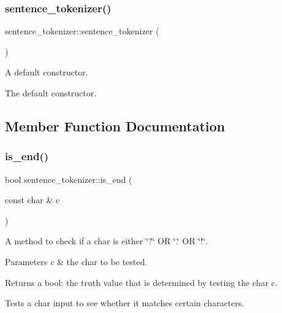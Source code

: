 \subsubsection{\texorpdfstring{sentence\+\_\+tokenizer()}{sentence\_tokenizer()}}
{\footnotesize\ttfamily sentence\+\_\+tokenizer\+::sentence\+\_\+tokenizer (\begin{DoxyParamCaption}{ }\end{DoxyParamCaption})}



A default constructor. 

The default constructor. 

\subsection{Member Function Documentation}
\mbox{\label{classsentence__tokenizer_accdc817790cdb696912ec8076701f8a9}} 
\subsubsection{\texorpdfstring{is\+\_\+end()}{is\_end()}}
{\footnotesize\ttfamily bool sentence\+\_\+tokenizer\+::is\+\_\+end (\begin{DoxyParamCaption}\item[{const char \&}]{c }\end{DoxyParamCaption})}



A method to check if a char is either \char`\"{}?\char`\"{} OR \char`\"{}.\char`\"{} OR \char`\"{}!\char`\"{}. 


\begin{DoxyParams}{Parameters}
{\em c} & the char to be tested. \\
\hline
\end{DoxyParams}
\begin{DoxyReturn}{Returns}
a bool\+: the truth value that is determined by testing the char c.
\end{DoxyReturn}
Tests a char input to see whether it matches certain characters. \mbox{\label{classsentence__tokenizer_a2f86e3437eb3a948b5ee309ce04d0029}} 
